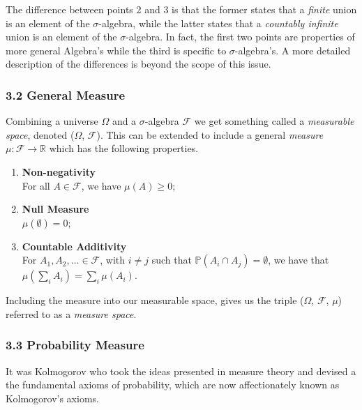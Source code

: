 \documentclass[11pt]{article}
\begin{document}
The difference between points 2 and 3 is that the former states that a \textit{finite} union is an element of the $\sigma$-algebra, while the latter states that a \textit{countably infinite} union is an element of the $\sigma$-algebra. In fact, the first two points are properties of more general Algebra's while the third is specific to $\sigma$-algebra's. A more detailed description of the differences is beyond the scope of this issue.

\subsubsection*{3.2 General Measure}
Combining a universe $\Omega$ and a $\sigma$-algebra $\mathcal{F}$ we get something called a \textit{measurable space}, denoted ($\Omega$, $\mathcal{F}$). This can be extended to include a general \textit{measure} $\mu : \mathcal{F} \rightarrow \mathbb{R}$ which has the following properties.
\begin{enumerate}
    \item \textbf{Non-negativity} \\
    For all $A \in \mathcal{F}$, we have $\mu(A) \geq 0$;
    \item \textbf{Null Measure} \\
    $\mu(\emptyset) = 0$;
    \item \textbf{Countable Additivity} \\
    For $A_1, A_2, \ldots \in \mathcal{F}$, with $i \neq j$ such that $\mathbb{P}(A_i \cap A_j) = \emptyset$, we have that \\ $\mu(\sum_{i} A_i) = \sum_{i} \mu(A_i)$. 
\end{enumerate}

Including the measure into our measurable space, gives us the triple ($\Omega$, $\mathcal{F}$, $\mu$) referred to as a \textit{measure space}.

\newpage

\subsubsection*{3.3 Probability Measure}
It was Kolmogorov who took the ideas presented in measure theory and devised a the fundamental axioms of probability, which are now affectionately known as Kolmogorov's axioms.
\end{document}
